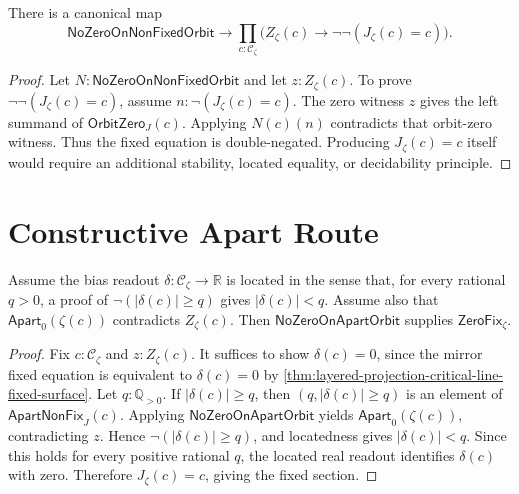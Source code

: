 \begin{proposition}
\label{prop:rh-layered-weak-orbit-exclusion-double-negation}
There is a canonical map
$$
\mathsf{NoZeroOnNonFixedOrbit}
\to
\prod_{c:\mathcal C_{\zeta}}
\bigl(Z_{\zeta}(c)\to\neg\neg(J_{\zeta}(c)=c)\bigr).
$$
\end{proposition}

\begin{proof}
Let $N:\mathsf{NoZeroOnNonFixedOrbit}$ and let
$z:Z_{\zeta}(c)$. To prove $\neg\neg(J_{\zeta}(c)=c)$, assume
$n:\neg(J_{\zeta}(c)=c)$. The zero witness $z$ gives the left summand of
$\mathsf{OrbitZero}_{J}(c)$. Applying $N(c)(n)$ contradicts that
orbit-zero witness. Thus the fixed equation is double-negated. Producing
$J_{\zeta}(c)=c$ itself would require an additional stability, located
equality, or decidability principle.
\end{proof}

\section{Constructive Apart Route}
\label{sec:rh-nonfixed-constructive-apart-route}

\begin{theorem}
\label{thm:rh-layered-apart-orbit-exclusion-yields-fixed-section}
Assume the bias readout $\delta:\mathcal C_{\zeta}\to\mathbb R$ is
located in the sense that, for every rational $q>0$, a proof of
$\neg(|\delta(c)|\ge q)$ gives $|\delta(c)|<q$. Assume also that
$\mathsf{Apart}_{0}(\zeta(c))$ contradicts $Z_{\zeta}(c)$. Then
$\mathsf{NoZeroOnApartOrbit}$ supplies $\mathsf{ZeroFix}_{\zeta}$.
\end{theorem}

\begin{proof}
Fix $c:\mathcal C_{\zeta}$ and $z:Z_{\zeta}(c)$. It suffices to show
$\delta(c)=0$, since the mirror fixed equation is equivalent to
$\delta(c)=0$ by
\autoref{thm:layered-projection-critical-line-fixed-surface}. Let
$q:\mathbb Q_{>0}$. If $|\delta(c)|\ge q$, then
$(q,|\delta(c)|\ge q)$ is an element of
$\mathsf{ApartNonFix}_{J}(c)$. Applying
$\mathsf{NoZeroOnApartOrbit}$ yields
$\mathsf{Apart}_{0}(\zeta(c))$, contradicting $z$. Hence
$\neg(|\delta(c)|\ge q)$, and locatedness gives $|\delta(c)|<q$. Since
this holds for every positive rational $q$, the located real readout
identifies $\delta(c)$ with zero. Therefore $J_{\zeta}(c)=c$, giving the
fixed section.
\end{proof}

